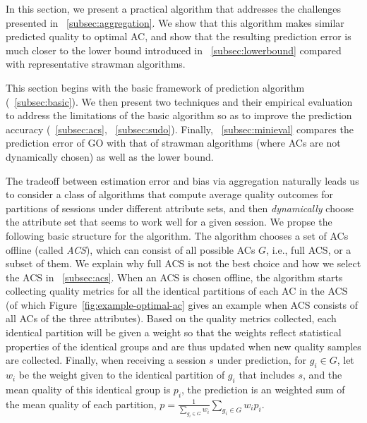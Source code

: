 \label{sec:prediction}
In this section, we present a practical algorithm that addresses the challenges presented in \Section~\ref{subsec:aggregation}. We show that this algorithm makes similar predicted quality to optimal AC, and show that the resulting prediction error is much closer to the lower bound introduced in \Section~\ref{subsec:lowerbound} compared with representative strawman algorithms.

This section begins with the basic framework of prediction algorithm (\Section~\ref{subsec:basic}). We then present two techniques and their empirical evaluation to address the limitations of the basic algorithm so as to improve the prediction accuracy (\Section~\ref{subsec:acs}, \Section~\ref{subsec:sudo}). Finally, \Section~\ref{subsec:minieval} compares the prediction error of GO with that of strawman algorithms (where ACs are not dynamically chosen) as well as the lower bound.


\label{subsec:basic}
The tradeoff between estimation error and bias via aggregation naturally leads us to consider a class of algorithms that compute average quality outcomes for partitions of sessions under different attribute sets, and then {\it dynamically} choose the attribute set that seems to work well for a given session. 
We propse the following basic structure for the algorithm. The algorithm chooses a set of ACs offline (called {\it ACS}), which can consist of all possible ACs $G$, i.e., full ACS, or a subset of them. 
We explain why full ACS is not the best choice and how we select the ACS in \Section~\ref{subsec:acs}. When an ACS is chosen offline, the algorithm starts collecting quality metrics for all the identical partitions of each AC in the ACS 
(of which Figure~\ref{fig:example-optimal-ac} gives an example when ACS consists of all ACs of the three attributes). Based on the quality metrics collected, each identical partition will be given a weight so that the weights reflect statistical properties of the identical groups and are thus updated when new quality samples are collected.
Finally, when receiving a session $s$ under prediction, for $g_i\in G$, let $w_i$ be the weight given to the identical partition of $g_i$ that includes $s$, and the mean quality of this identical group is $p_i$,
the prediction is an weighted sum of the mean quality of each partition, $p=\frac{1}{\sum_{g_i\in G} w_i}\sum_{g_i\in G} w_ip_i$.

